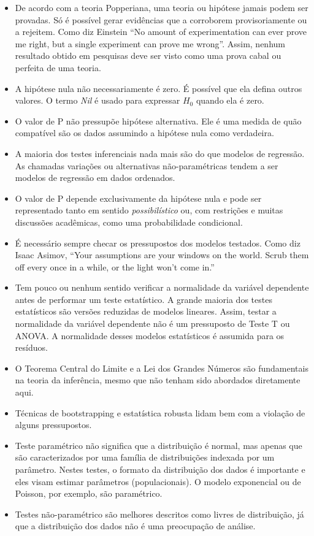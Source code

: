 \documentclass[
]{book}
\begin{document}
\begin{itemize}
\item
  De acordo com a teoria Popperiana, uma teoria ou hipótese jamais podem ser provadas. Só é possível gerar evidências que a corroborem provisoriamente ou a rejeitem. Como diz Einstein ``No amount of experimentation can ever prove me right, but a single experiment can prove me wrong''. Assim, nenhum resultado obtido em pesquisas deve ser visto como uma prova cabal ou perfeita de uma teoria.
\item
  A hipótese nula não necessariamente é zero. É possível que ela defina outros valores. O termo \emph{Nil} é usado para expressar \(H_0\) quando ela é zero.
\item
  O valor de P não pressupõe hipótese alternativa. Ele é uma medida de quão compatível são os dados assumindo a hipótese nula como verdadeira.
\item
  A maioria dos testes inferenciais nada mais são do que modelos de regressão. As chamadas variações ou alternativas não-paramétricas tendem a ser modelos de regressão em dados ordenados.
\item
  O valor de P depende exclusivamente da hipótese nula e pode ser representado tanto em sentido \emph{possibilístico} ou, com restrições e muitas discussões acadêmicas, como uma probabilidade condicional.
\item
  É necessário sempre checar os pressupostos dos modelos testados. Como diz Isaac Asimov, ``Your assumptions are your windows on the world. Scrub them off every once in a while, or the light won't come in.''
\item
  Tem pouco ou nenhum sentido verificar a normalidade da variável dependente antes de performar um teste estatístico. A grande maioria dos testes estatísticos são versões reduzidas de modelos lineares. Assim, testar a normalidade da variável dependente não é um pressuposto de Teste T ou ANOVA. A normalidade desses modelos estatísticos é assumida para os resíduos.
\item
  O Teorema Central do Limite e a Lei dos Grandes Números são fundamentais na teoria da inferência, mesmo que não tenham sido abordados diretamente aqui.
\item
  Técnicas de bootstrapping e estatística robusta lidam bem com a violação de alguns pressupostos.
\item
  Teste paramétrico não significa que a distribuição é normal, mas apenas que são caracterizados por uma família de distribuições indexada por um parâmetro. Nestes testes, o formato da distribuição dos dados é importante e eles visam estimar parâmetros (populacionais). O modelo exponencial ou de Poisson, por exemplo, são paramétrico.
\item
  Testes não-paramétrico são melhores descritos como livres de distribuição, já que a distribuição dos dados não é uma preocupação de análise.
\end{itemize}
\end{document}
